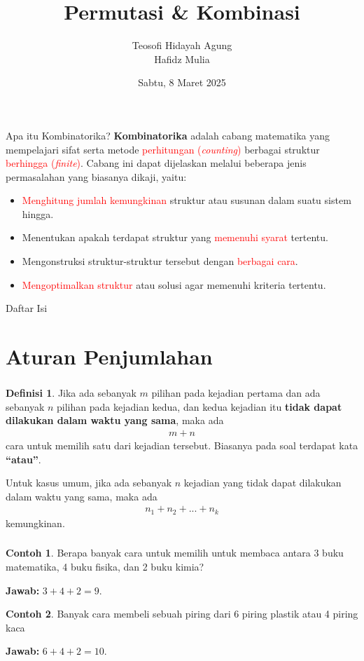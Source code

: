 \documentclass[aspectratio=169]{beamer}
\date{Sabtu, 8 Maret 2025}
\title[Kombinatorika]{Permutasi \& Kombinasi}
\author[Tew \& Haf]{Teosofi Hidayah Agung\\Hafidz Mulia}
\theoremstyle{definition}
\newtheorem{definisi}{Definisi}
\newtheorem{contoh}{Contoh}
\begin{document}
\begin{frame}
    \titlepage
\end{frame}

\begin{frame}{Apa itu Kombinatorika?}
  \textbf{Kombinatorika} adalah cabang matematika yang mempelajari sifat serta metode \textcolor{red}{perhitungan (\textit{counting})} berbagai struktur \textcolor{red}{berhingga (\textit{finite})}. Cabang ini dapat dijelaskan melalui beberapa jenis permasalahan yang biasanya dikaji, yaitu:
  \begin{itemize}
    \item \textcolor{red}{Menghitung jumlah kemungkinan} struktur atau susunan dalam suatu sistem hingga.
    \item Menentukan apakah terdapat struktur yang \textcolor{red}{memenuhi syarat} tertentu.
    \item Mengonstruksi struktur-struktur tersebut dengan \textcolor{red}{berbagai cara}.
    \item \textcolor{red}{Mengoptimalkan struktur} atau solusi agar memenuhi kriteria tertentu.
  \end{itemize}
\end{frame}

\begin{frame}{Daftar Isi}
    \tableofcontents
\end{frame}

\section{Aturan Penjumlahan}
\begin{frame}
\frametitle{\insertsection}
\begin{definisi}
  Jika ada sebanyak $m$ pilihan pada kejadian pertama dan ada sebanyak $n$ pilihan pada kejadian kedua, dan kedua kejadian itu \textbf{tidak dapat dilakukan dalam waktu yang sama}, maka ada 
\begin{align}
    m+n
\end{align} 
cara untuk memilih satu dari kejadian tersebut. Biasanya pada soal terdapat kata \textbf{``atau''}.
\end{definisi}
Untuk kasus umum, jika ada sebanyak $n$ kejadian yang tidak dapat dilakukan dalam waktu yang sama, maka ada
\begin{align}
    n_1+n_2+...+n_k
\end{align}
kemungkinan.
\end{frame}

\begin{frame}
  \frametitle{\insertsection}
  \begin{contoh}
    Berapa banyak cara untuk memilih untuk membaca antara 3 buku matematika, 4 buku fisika, dan 2 buku kimia? 
  \end{contoh}
  \textbf{Jawab:} $3+4+2=9$.
  \begin{contoh}
    Banyak cara membeli sebuah piring dari 6 piring plastik atau 4 piring kaca
  \end{contoh}
  \textbf{Jawab:} $6+4+2=10$.
\end{frame}
\end{document}
